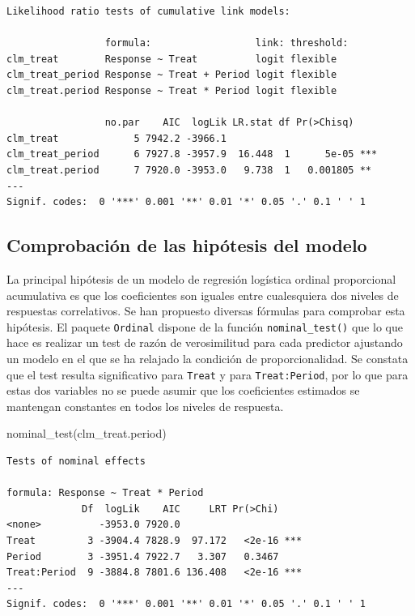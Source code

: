 \documentclass[
  12pt,
  a4paper,
  extrafontsizes,
  onecolumn,
  openright]{memoir}
\newenvironment{Shaded}{\begin{snugshade}}{\end{snugshade}}
\newcommand{\FunctionTok}[1]{\textcolor[rgb]{0.28,0.35,0.67}{#1}}
\newcommand{\NormalTok}[1]{\textcolor[rgb]{0.00,0.23,0.31}{#1}}
\begin{document}
\begin{verbatim}
Likelihood ratio tests of cumulative link models:
 
                 formula:                  link: threshold:
clm_treat        Response ~ Treat          logit flexible  
clm_treat_period Response ~ Treat + Period logit flexible  
clm_treat.period Response ~ Treat * Period logit flexible  

                 no.par    AIC  logLik LR.stat df Pr(>Chisq)    
clm_treat             5 7942.2 -3966.1                          
clm_treat_period      6 7927.8 -3957.9  16.448  1      5e-05 ***
clm_treat.period      7 7920.0 -3953.0   9.738  1   0.001805 ** 
---
Signif. codes:  0 '***' 0.001 '**' 0.01 '*' 0.05 '.' 0.1 ' ' 1
\end{verbatim}

\normalsize

\hypertarget{comprobaciuxf3n-de-las-hipuxf3tesis-del-modelo}{%
\subsection{Comprobación de las hipótesis del
modelo}\label{comprobaciuxf3n-de-las-hipuxf3tesis-del-modelo}}

La principal hipótesis de un modelo de regresión logística ordinal
proporcional acumulativa es que los coeficientes son iguales entre
cualesquiera dos niveles de respuestas correlativos. Se han propuesto
diversas fórmulas para comprobar esta hipótesis. El paquete
\texttt{Ordinal} dispone de la función \texttt{nominal\_test()} que lo
que hace es realizar un test de razón de verosimilitud para cada
predictor ajustando un modelo en el que se ha relajado la condición de
proporcionalidad. Se constata que el test resulta significativo para
\texttt{Treat} y para \texttt{Treat:Period}, por lo que para estas dos
variables no se puede asumir que los coeficientes estimados se mantengan
constantes en todos los niveles de respuesta.

\scriptsize

\begin{Shaded}
\begin{Highlighting}[]
\FunctionTok{nominal\_test}\NormalTok{(clm\_treat.period)}
\end{Highlighting}
\end{Shaded}

\begin{verbatim}
Tests of nominal effects

formula: Response ~ Treat * Period
             Df  logLik    AIC     LRT Pr(>Chi)    
<none>          -3953.0 7920.0                     
Treat         3 -3904.4 7828.9  97.172   <2e-16 ***
Period        3 -3951.4 7922.7   3.307   0.3467    
Treat:Period  9 -3884.8 7801.6 136.408   <2e-16 ***
---
Signif. codes:  0 '***' 0.001 '**' 0.01 '*' 0.05 '.' 0.1 ' ' 1
\end{verbatim}
\end{document}
